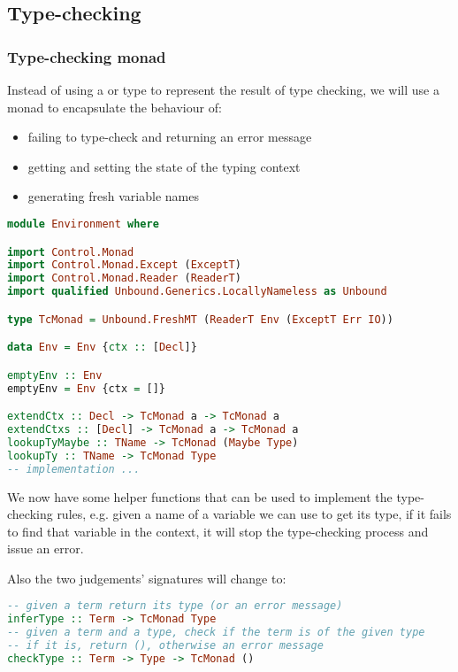 \subsection{Type-checking}

\subsubsection{Type-checking monad}
Instead of using a  or  type to represent the result of type checking, we will use a monad to encapsulate the behaviour of:
\begin{itemize}
       \item failing to type-check and returning an error message
       \item getting and setting the state of the typing context
       \item generating fresh variable names
\end{itemize}

\begin{lstlisting}[language=Haskell]
module Environment where

import Control.Monad
import Control.Monad.Except (ExceptT)
import Control.Monad.Reader (ReaderT)
import qualified Unbound.Generics.LocallyNameless as Unbound

type TcMonad = Unbound.FreshMT (ReaderT Env (ExceptT Err IO))

data Env = Env {ctx :: [Decl]}

emptyEnv :: Env
emptyEnv = Env {ctx = []}

extendCtx :: Decl -> TcMonad a -> TcMonad a
extendCtxs :: [Decl] -> TcMonad a -> TcMonad a
lookupTyMaybe :: TName -> TcMonad (Maybe Type)
lookupTy :: TName -> TcMonad Type
-- implementation ...
\end{lstlisting}

We now have some helper functions that can be used to implement the type-checking rules, e.g. given a name of a variable we can use  to get its type, if it fails to find that variable in the context, it will stop the type-checking process and issue an error.

Also the two judgements' signatures will change to:

\begin{lstlisting}[language=Haskell]
-- given a term return its type (or an error message)
inferType :: Term -> TcMonad Type
-- given a term and a type, check if the term is of the given type
-- if it is, return (), otherwise an error message
checkType :: Term -> Type -> TcMonad ()
\end{lstlisting}


